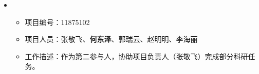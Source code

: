   \begin{itemize}[leftmargin=*]
    \item
      {\small
      \begin{itemize}
%
        \item 项目编号：11875102
        \item {项目人员：张敬飞、{\bf 何东泽}、郭瑞云、赵明明、李海丽}
        \item 工作描述：作为第二参与人，协助项目负责人（张敬飞）完成部分科研任务。
      \end{itemize}
      }
  \end{itemize}